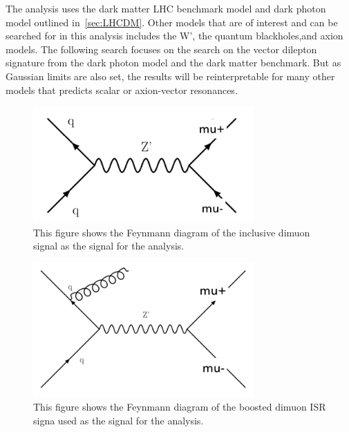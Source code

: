     The analysis uses the dark matter LHC benchmark model and dark photon model outlined in~\ref{sec:LHCDM}.
Other models that are of interest and can be searched for in this analysis includes the W', the quantum blackholes,and axion models. 
The following search focuses on the search on the vector dilepton signature from the dark photon model and the dark matter benchmark. But as Gaussian limits are also set, the results will be reinterpretable for many other models that predicts scalar or axion-vector resonances. 

\begin{figure}[!htb]
    \begin{center}
        \includegraphics[width=0.75\textwidth]{figures/chapter_dimuon/dimuonFeynman}
        \caption{
            This figure shows the Feynmann diagram of the inclusive dimuon signal as the signal for the analysis. }
            \label{fig:dimuonFeynmann}
    \end{center}
\end{figure}


\begin{figure}[!htb]
    \begin{center}
        \includegraphics[width=0.75\textwidth]{figures/chapter_dimuon/dimuonISRFeynmann}
        \caption{
        This figure shows the Feynmann diagram of the boosted dimuon ISR signa used as the signal for the analysis. }
            \label{fig:dimuonFeynmann}
    \end{center}
\end{figure}


